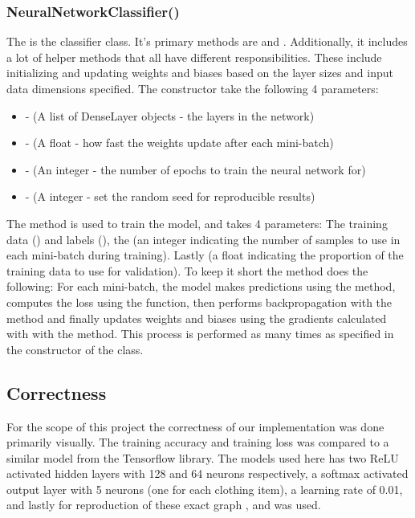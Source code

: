 \subsubsection{NeuralNetworkClassifier()}
The  is the classifier class.
It's primary methods are  and .
Additionally, it includes a lot of helper methods that all have different responsibilities.
These include initializing and updating weights and biases based on the layer sizes and input data dimensions specified.
The constructor take the following 4 parameters:\\
\begin{itemize}
    \item {} - (A list of DenseLayer objects - the layers in the network)
    \item {} - (A float - how fast the weights update after each mini-batch)
    \item {} - (An integer - the number of epochs to train the neural network for)
    \item {} - (A integer - set the random seed for reproducible results)
    \end{itemize}
\vspace{10pt}


The  method is used to train the model, and takes 4 parameters:
The training data () and labels (), the  (an integer indicating the number of samples to use in each mini-batch during training).
Lastly  (a float indicating the proportion of the training data to use for validation).
To keep it short the  method does the following:
For each mini-batch, the model makes predictions using the  method, computes the loss using the  function, then performs backpropagation with the  method and finally updates weights and biases using the gradients calculated with  with the  method.
This process is performed as many times as specified in the constructor of the class.

\subsection{Correctness}
For the scope of this project the correctness of our implementation was done primarily visually.
The training accuracy and training loss was compared to a similar model from the Tensorflow library.
The models used here has two ReLU activated hidden layers with 128 and 64 neurons respectively, a softmax activated output layer with 5 neurons (one for each clothing item), a learning rate of 0.01, and lastly for reproduction of these exact graph , and  was used.\\

